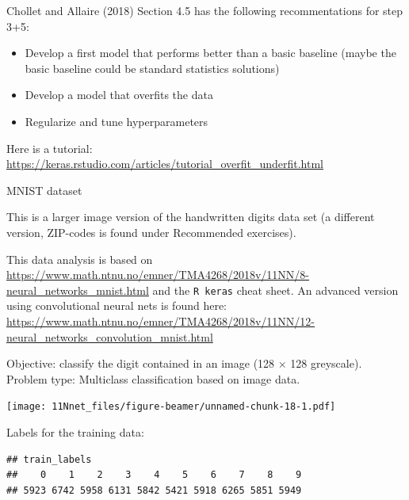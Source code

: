 \documentclass[10pt,ignorenonframetext,]{beamer}
\providecommand{\tightlist}{%
  \setlength{\itemsep}{0pt}\setlength{\parskip}{0pt}}
\begin{document}
\begin{frame}

Chollet and Allaire (2018) Section 4.5 has the following recommentations
for step 3+5:

\begin{itemize}
\tightlist
\item
  Develop a first model that performs better than a basic baseline
  (maybe the basic baseline could be standard statistics solutions)
\item
  Develop a model that overfits the data
\item
  Regularize and tune hyperparameters
\end{itemize}

Here is a tutorial:
\url{https://keras.rstudio.com/articles/tutorial_overfit_underfit.html}

\end{frame}

\begin{frame}[fragile]

\begin{block}{MNIST dataset}

This is a larger image version of the handwritten digits data set (a
different version, ZIP-codes is found under Recommended exercises).

This data analysis is based on
\url{https://www.math.ntnu.no/emner/TMA4268/2018v/11NN/8-neural_networks_mnist.html}
and the \texttt{R\ keras} cheat sheet. An advanced version using
convolutional neural nets is found here:
\url{https://www.math.ntnu.no/emner/TMA4268/2018v/11NN/12-neural_networks_convolution_mnist.html}

\end{block}

\end{frame}

\begin{frame}

Objective: classify the digit contained in an image (128 \(\times\) 128
greyscale). Problem type: Multiclass classification based on image data.

\texttt{[image: 11Nnet\_files/figure-beamer/unnamed-chunk-18-1.pdf]}

\end{frame}

\begin{frame}[fragile]

Labels for the training data:

\begin{verbatim}
## train_labels
##    0    1    2    3    4    5    6    7    8    9 
## 5923 6742 5958 6131 5842 5421 5918 6265 5851 5949
\end{verbatim}

\end{frame}
\end{document}
